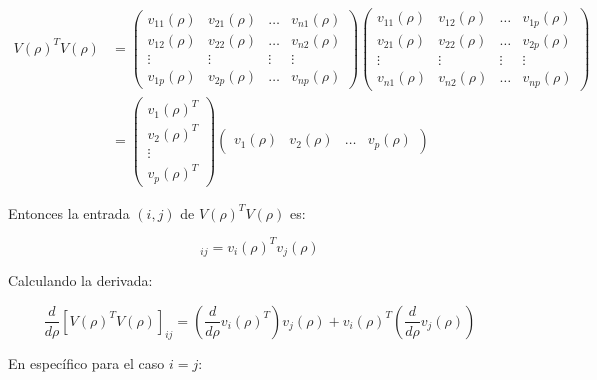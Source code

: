 \begin{equation*}
\begin{aligned}
V(\rho)^T V(\rho)  &= \left(\!
    \begin{array}{cccc}
      v_{11}(\rho) & v_{21}(\rho) & \hdots & v_{n1}(\rho) \\
      v_{12}(\rho) & v_{22}(\rho) & \hdots & v_{n2}(\rho) \\
      \vdots & \vdots & \vdots & \vdots \\
      v_{1p}(\rho) & v_{2p}(\rho) & \hdots & v_{np}(\rho) 
    \end{array}
  \!\right)
    \left(\!
    \begin{array}{cccc}
      v_{11}(\rho) & v_{12}(\rho) & \hdots & v_{1p}(\rho) \\
      v_{21}(\rho) & v_{22}(\rho) & \hdots & v_{2p}(\rho) \\
      \vdots & \vdots & \vdots & \vdots \\
      v_{n1}(\rho) & v_{n2}(\rho) & \hdots & v_{np}(\rho) 
    \end{array} 
    \!\right) \\
 &= \left(\!
    \begin{array}{c}
      v_{1}(\rho)^T \\
      v_{2}(\rho)^T \\
      \vdots \\
      v_{p}(\rho)^T  
    \end{array}
  \!\right)
  \left(\!
    \begin{array}{cccc}
      v_{1}(\rho) & v_{2}(\rho) & \hdots & v_{p}(\rho) 
    \end{array} 
	\!\right) 
\end{aligned}
\end{equation*}

Entonces la entrada $(i,j)$ de $V(\rho)^T V(\rho)$ es:

\begin{equation*}
	[V(\rho)^T V(\rho)]_{ij} = v_i(\rho)^T v_j(\rho)
\end{equation*}

Calculando la derivada:

\begin{equation*}
\frac{d}{d\rho}[V(\rho)^T V(\rho)]_{ij} =  \left( \frac{d}{d\rho}v_i(\rho)^T \right)  v_j(\rho) + v_i(\rho)^T \left( \frac{d}{d\rho} v_j(\rho)\right) 
\end{equation*}

En específico para el caso $i = j$:

